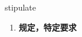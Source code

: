 
\begin{frame}
{\huge stipulate}
\begin{center}
\begin{enumerate}\Large
  \item \textbf{规定，特定要求}
\end{enumerate}
\end{center}
\end{frame}
